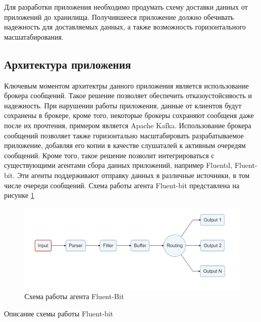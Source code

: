 \documentclass[14pt, russian]{scrartcl}
\begin{document}
Для разработки приложения необходимо продумать схему доставки данных от приложений
до хранилища. Получившееся приложение должно обечивать надежность
для доставляемых данных, а также возможность горизонтального масшатабирования.


\subsection{Архитектура приложения}

Ключевым моментом архитектры данного приложения
является использование брокера сообщений. Такое решение
позволяет обеспечить отказоустойсивость и надежность.
При нарушении работы приложения, данные от клиентов будут сохранены в брокере,
кроме того, некоторые брокеры сохраняют сообщеня даже после их прочтения,
примером является Apache Kafka. Использование брокера
сообщений позволяет также горизонтально масштабировать
разрабатываемое приложение, добавляя его копии в качестве
слушаталей к активным очередям сообщений. Кроме того,
такое решение позволит интегрироваться с существующими
агентами сбора данных приложений, например  Fluentd, Fluent-bit.
Эти агенты поддерживают отправку данных в различные источники, в том
числе очереди сообщений. Схема работы агента Fluent-bit представлена на
рисунке \ref{fig:fluentbitscheme}

\begin{figure}[H]
	\centering
	\begin{minipage}[t]{.9\textwidth}
		\centering
		\includegraphics[width=.7\textwidth]{./imgs/fluentbit.png}
	\end{minipage}
	\caption{Схема работы агента Fluent-Bit}
	\label{fig:fluentbitscheme}
\end{figure}

Описание схемы работы Fluent-bit
\end{document}

